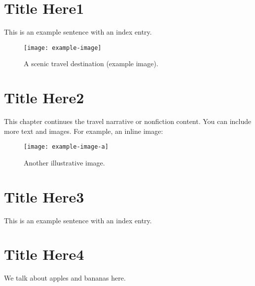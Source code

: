 \documentclass[10pt,openany]{book}
\begin{document}
\mainmatter








\chapter{Title Here1}
This is an example sentence with an index entry.


\lipsum[1]  %

\begin{figure}[htbp]
  \centering
  \texttt{[image: example-image]} %
  \caption{A scenic travel destination (example image).}
\end{figure}

\lipsum[1]  %

\lipsum[2]  %

\chapter{Title Here2}
This chapter continues the travel narrative or nonfiction content. You can include more text and images. For example, an inline image:
\begin{figure}[htbp]
  \centering
  \texttt{[image: example-image-a]} 
  \caption{Another illustrative image.}
\end{figure}

\lipsum[1]  %




\chapter{Title Here3}
This is an example sentence with an index entry.

\chapter{Title Here4}
We talk about apples and bananas here.
\end{document}
